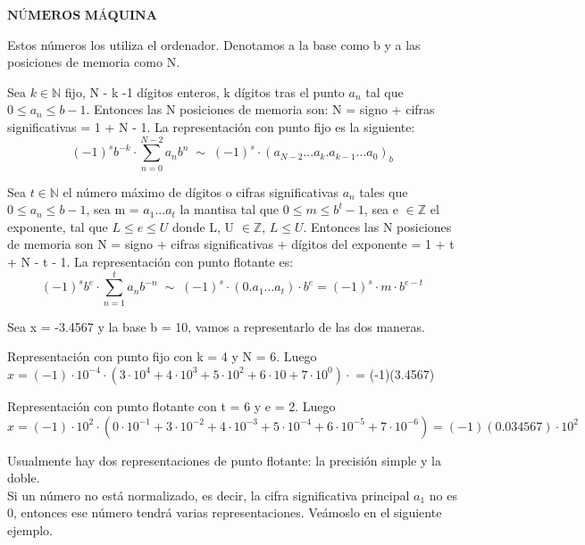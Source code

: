 $\textbf{NÚMEROS MÁQUINA}$

Estos números los utiliza el ordenador. Denotamos a la base como b y a las posiciones de memoria como N.

\begin{ndef}
Sea $k \in \mathbb{N}$ fijo, N - k -1 dígitos enteros, k dígitos tras el punto $a_n$ tal que $0 \leq a_n \leq b - 1$. Entonces las N posiciones de memoria son: N = signo + cifras significativas = 1 + N - 1. La representación con punto fijo es la siguiente:
\[ (-1)^s b^{-k} \cdot \sum_{n=0}^{N-2}a_nb^n \; \sim \; (-1)^s \cdot (a_{N-2}...a_k.a_{k-1}...a_0)_b \]
\end{ndef}

\begin{ndef}
Sea $t \in \mathbb{N}$ el número máximo de dígitos o cifras significativas $a_n$ tales que $0 \leq a_n \leq b - 1$, sea m = $a_1...a_t$ la mantisa tal que $0 \leq m \leq b^t - 1$, sea e $\in \mathbb{Z}$ el exponente, tal que $L \leq e \leq U$ donde L, U $\in \mathbb{Z}$, $L \leq U$. Entonces las N posiciones de memoria son N = signo + cifras significativas + dígitos del exponente = 1 + t + N - t - 1. La representación con punto flotante es:
\[ (-1)^sb^e \cdot \sum_{n=1}^t a_nb^{-n} \; \sim \; (-1)^s \cdot (0.a_1...a_t) \cdot b^e = (-1)^s \cdot m \cdot b^{e-t} \]
\end{ndef}

\begin{ejemplo}
Sea x = -3.4567 y la base b = 10, vamos a representarlo de las dos maneras.
	\begin{nlist}
	\item Representación con punto fijo con k = 4 y N = 6. Luego $x = (-1) \cdot 10^{-4} \cdot (3 \cdot 10^4 + 4 \cdot 10^3 + 5 \cdot 10^2 + 6 \cdot 10 + 7 \cdot 10^0)·$ = (-1)(3.4567)
	\item Representación con punto flotante con t = 6 y e = 2. Luego $x = (-1) \cdot 10^2 \cdot (0 \cdot 10^{-1} + 3 \cdot 10^{-2} + 4 \cdot 10^{-3} + 5 \cdot 10^{-4} + 6 \cdot 10^{-5} + 7 \cdot 10^{-6}) = (-1)(0.034567) \cdot 10^2$
	\end{nlist}
\end{ejemplo}

Usualmente hay dos representaciones de punto flotante: la precisión simple y la doble.\\
Si un número no está normalizado, es decir, la cifra significativa principal $a_1$ no es 0, entonces ese número tendrá varias representaciones. Veámoslo en el siguiente ejemplo. 

